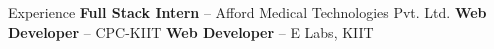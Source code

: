 \begin{rubric}{Experience}
%
	\textbf{Full Stack Intern} -- Afford Medical Technologies Pvt. Ltd.
%
%
	\textbf{Web Developer} -- CPC-KIIT
%
%
	\textbf{Web Developer} -- E Labs, KIIT
%
\end{rubric}